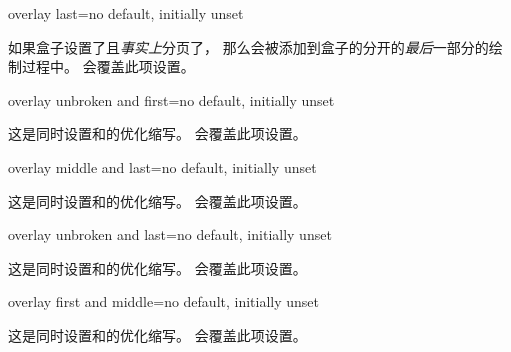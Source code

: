 \begin{docTcbKey}{overlay last}{=}{no default, initially unset}

如果盒子设置了且\emph{事实上}分页了，
那么会被添加到盒子的分开的\emph{最后}一部分的绘制过程中。
会覆盖此项设置。
\end{docTcbKey}




\begin{docTcbKey}{overlay unbroken and first}{=}{no default, initially unset}

这是同时设置和的优化缩写。
会覆盖此项设置。
\end{docTcbKey}

\begin{docTcbKey}{overlay middle and last}{=}{no default, initially unset}

这是同时设置和的优化缩写。
会覆盖此项设置。
\end{docTcbKey}

\begin{docTcbKey}{overlay unbroken and last}{=}{no default, initially unset}

这是同时设置和的优化缩写。
会覆盖此项设置。
\end{docTcbKey}





\begin{docTcbKey}[][doc new=2014-09-19]{overlay first and middle}{=}{no default, initially unset}

这是同时设置和的优化缩写。
会覆盖此项设置。
\end{docTcbKey}



